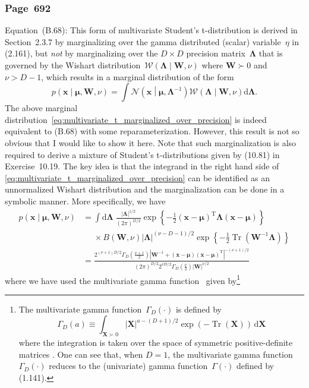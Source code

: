 \documentclass[12pt,a4paper]{article}
\newcommand{\erratum}[1]{\subsubsection*{#1}}
\begin{document}
\erratum{Page~692}
Equation~(B.68):
This form of multivariate Student's t-distribution is derived in Section~2.3.7
by marginalizing over the gamma distributed (scalar) variable~$\eta$ in (2.161),
but \emph{not} by marginalizing over
the $D \times D$ precision matrix~$\bm{\Lambda}$ that is governed by
the Wishart distribution~$\mathcal{W}\left(\bm{\Lambda}\middle|\mathbf{W}, \nu\right)$
where $\mathbf{W} \succ 0$ and $\nu > D - 1$,
which results in a marginal distribution of the form
\begin{equation}
p\left(\mathbf{x}\middle|\bm{\mu}, \mathbf{W}, \nu\right) =
  \int \mathcal{N}\left(\mathbf{x}\middle|\bm{\mu}, \bm{\Lambda}^{-1}\right)
    \mathcal{W}\left(\bm{\Lambda}\middle|\mathbf{W}, \nu\right) \mathrm{d}\bm{\Lambda} .
\label{eq:multivariate_t_marginalized_over_precision}
\end{equation}
The above marginal distribution~\eqref{eq:multivariate_t_marginalized_over_precision} is indeed
equivalent to (B.68) with some reparameterization.
However, this result is not so obvious that I would like to show it here.
Note that such marginalization is also required to derive
a mixture of Student's t-distributions given by (10.81) in Exercise~10.19.
The key idea is that the integrand in the right hand side of
\eqref{eq:multivariate_t_marginalized_over_precision} can be identified as an unnormalized
Wishart distribution and the marginalization can be done in a symbolic manner.
More specifically, we have
\begin{align}
p\left(\mathbf{x}\middle|\bm{\mu}, \mathbf{W}, \nu\right)
&=
\int \mathrm{d}\bm{\Lambda} \; \frac{\left|\bm{\Lambda}\right|^{1/2}}{\left(2\pi\right)^{D/2}}
  \exp\left\{-\frac{1}{2}
    \left(\mathbf{x} - \bm{\mu}\right)^{\operatorname{T}}
    \bm{\Lambda}
    \left(\mathbf{x} - \bm{\mu}\right)
  \right\} \nonumber \\
&\phantom{=} \times
B\left(\mathbf{W}, \nu\right) \left|\bm{\Lambda}\right|^{(\nu - D - 1)/2}
  \exp\left\{
    -\frac{1}{2} \operatorname{Tr}\left( \mathbf{W}^{-1}\bm{\Lambda} \right)
  \right\}  \\
&=
\frac{
  2^{(\nu + 1)D/2} \Gamma_D \left(\frac{\nu + 1}{2}\right)
  \left| \mathbf{W}^{-1} +
    \left(\mathbf{x} - \bm{\mu}\right)\left(\mathbf{x} - \bm{\mu}\right)^{\operatorname{T}}
  \right|^{-(\nu + 1)/2}
}{
  \left(2\pi\right)^{D/2}
  2^{\nu D/2} \Gamma_D \left(\frac{\nu}{2}\right) \left|\mathbf{W}\right|^{\nu/2}
}
\end{align}
where we have used the multivariate gamma function~\citep{NIST:DLMF}
given by\footnote{The multivariate gamma function~$\Gamma_D (\cdot)$ is defined by
\begin{equation}
\Gamma_D (a) \equiv \int_{\mathbf{X} \succ 0}
\left|\mathbf{X}\right|^{a - (D + 1)/2} \exp(-\operatorname{Tr}(\mathbf{X}))
\,\mathrm{d}\mathbf{X}
\label{eq:multivariate_gamma_definition}
\end{equation}
where the integration is taken over the space of symmetric positive-definite matrices
\citep{NIST:DLMF}.
One can see that, when $D=1$, the multivariate gamma function~$\Gamma_D (\cdot)$ reduces to
the (univariate) gamma function~$\Gamma(\cdot)$ defined by (1.141).}
\end{document}
